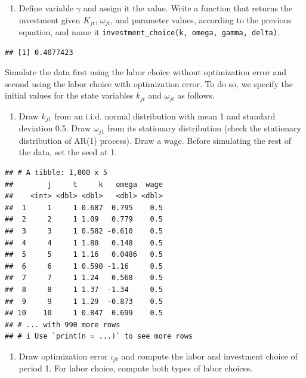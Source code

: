 \documentclass[
]{book}
\providecommand{\tightlist}{%
  \setlength{\itemsep}{0pt}\setlength{\parskip}{0pt}}
\begin{document}
\begin{enumerate}
\def\labelenumi{\arabic{enumi}.}
\setcounter{enumi}{4}
\tightlist
\item
  Define variable \(\gamma\) and assign it the value. Write a function that returns the investment given \(K_{jt}\), \(\omega_{jt}\), and parameter values, according to the previous equation, and name it \texttt{investment\_choice(k,\ omega,\ gamma,\ delta)}.
\end{enumerate}

\begin{verbatim}
## [1] 0.4077423
\end{verbatim}

Simulate the data first using the labor choice without optimization error and second using the labor choice with optimization error. To do so, we specify the initial values for the state variables \(k_{jt}\) and \(\omega_{jt}\) as follows.

\begin{enumerate}
\def\labelenumi{\arabic{enumi}.}
\setcounter{enumi}{5}
\tightlist
\item
  Draw \(k_{j1}\) from an i.i.d. normal distribution with mean 1 and standard deviation 0.5. Draw \(\omega_{j1}\) from its stationary distribution (check the stationary distribution of AR(1) process). Draw a wage. Before simulating the rest of the data, set the seed at 1.
\end{enumerate}

\begin{verbatim}
## # A tibble: 1,000 x 5
##        j     t     k   omega  wage
##    <int> <dbl> <dbl>   <dbl> <dbl>
##  1     1     1 0.687  0.795    0.5
##  2     2     1 1.09   0.779    0.5
##  3     3     1 0.582 -0.610    0.5
##  4     4     1 1.80   0.148    0.5
##  5     5     1 1.16   0.0486   0.5
##  6     6     1 0.590 -1.16     0.5
##  7     7     1 1.24   0.568    0.5
##  8     8     1 1.37  -1.34     0.5
##  9     9     1 1.29  -0.873    0.5
## 10    10     1 0.847  0.699    0.5
## # ... with 990 more rows
## # i Use `print(n = ...)` to see more rows
\end{verbatim}

\begin{enumerate}
\def\labelenumi{\arabic{enumi}.}
\setcounter{enumi}{6}
\tightlist
\item
  Draw optimization error \(\iota_{jt}\) and compute the labor and investment choice of period 1. For labor choice, compute both types of labor choices.
\end{enumerate}
\end{document}
